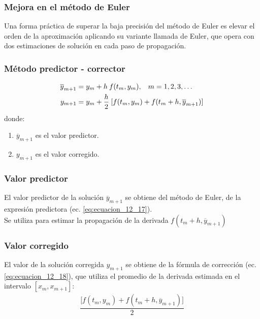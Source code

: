 \documentclass[12pt]{beamer}
\begin{document}
\begin{frame}
\frametitle{Mejora en el método de Euler}
Una forma práctica de superar la baja precisión del método de Euler es elevar el orden de la aproximación aplicando su variante llamada   de Euler, que opera con dos estimaciones de solución en cada paso de propagación.
\end{frame}
\begin{frame}
\frametitle{Método predictor - corrector}
\begin{align}
\overline{y}_{m + 1} &= y_{m} + h \: f (t_{m}, y_{m}), \hspace{0.3cm} m = 1, 2, 3, \ldots \label{eq:ecuacion_12_17} \\
y_{m + 1} &= y_{m} + \dfrac{h}{2} \: [ f(t_{m}, y_{m}) + f (t_{m} + h, \overline{y}_{m + 1})] \label{eq:ecuacion_12_18}
\end{align}
\pause
donde:
\begin{enumerate}[<+->]
\item $\overline{y}_{m + 1}$ es el valor predictor.
\item $y_{m + 1}$ es el valor corregido.
\end{enumerate}
\end{frame}
\begin{frame}
\frametitle{Valor predictor}
El valor predictor de la solución $ \overline{y}_{m + 1}$ se obtiene del método de Euler, de la expresión predictora (ec. \ref{eq:ecuacion_12_17}).
\\
\bigskip
\pause
Se utiliza para estimar la propagación de la derivada $f (t_{m} + h, \overline{y}_{m + 1})$
\end{frame}
\begin{frame}
\frametitle{Valor corregido}
El valor de la solución corregida $y_{m + 1}$ se obtiene de la fórmula de corrección (ec. \ref{eq:ecuacion_12_18}), que utiliza el promedio de la derivada estimada en el intervalo $[x_{m}, x_{m + 1}]$:
\pause
\begin{align*}
\dfrac{\big[ f (t_{m}, y_{m}) + f (t_{m} + h, \overline{y}_{m + 1}) \big]}{2}
\end{align*}
\end{frame}
\end{document}
